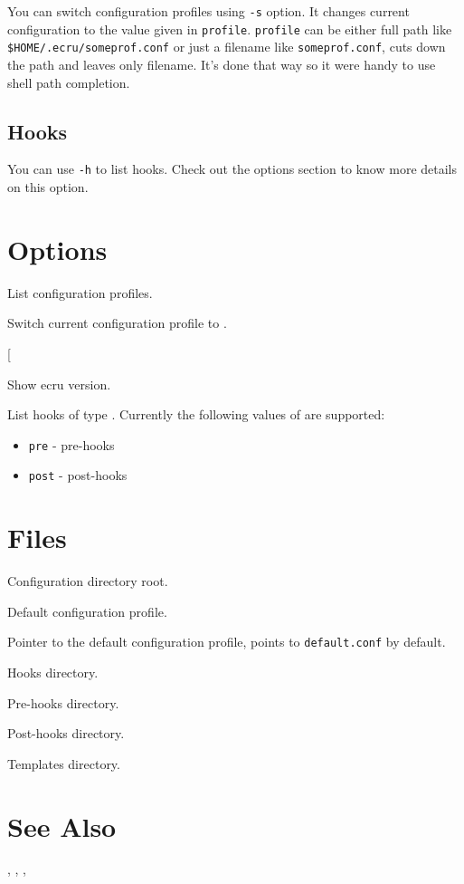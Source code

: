 \documentclass[english]{article}
\begin{document}
You can switch configuration profiles using \texttt{-s} option. 
It changes current configuration to the value given in \texttt{profile}. \texttt{profile}
can be either full path like \texttt{\$HOME/.ecru/someprof.conf} or just a
filename like \texttt{someprof.conf},  cuts down the path and leaves
only filename. It's done that way so it were handy to use shell path completion.

\subsection{Hooks}
You can use \texttt{-h} to list hooks. Check out the options section to know more
details on this option.

\section{Options}

\begin{Description}\setlength{\itemsep}{0cm}
\item[\Opt{-l}] List configuration profiles.
\item[\OptArg{-s}{path} Switch current configuration profile to \Arg{path}.
\item[\Opt{-v}] Show ecru version.
\item[\OptArg{-h}{hook}] List hooks of type . Currently the following
values of  are supported:
	\begin{itemize}
		\item \texttt{pre} - pre-hooks
		\item \texttt{post} - post-hooks
	\end{itemize}
\end{Description}

\section{Files}

\begin{Description}\setlength{\itemsep}{0cm}
\item[\File{\$HOME/.ecru}] Configuration directory root.
\item[\File{\$HOME/.ecru/default.conf}] Default configuration profile.
\item[\File{\$HOME/.ecru/current}] Pointer to the default configuration
profile, points to \texttt{default.conf} by default.
\item[\File{\$HOME/.ecru/hooks}] Hooks directory.
\item[\File{\$HOME/.ecru/hooks/pre}] Pre-hooks directory.
\item[\File{\$HOME/.ecru/hooks/post}] Post-hooks directory.
\item[\File{\$HOME/.ecru/templates}] Templates directory.
\end{Description}

\section{See Also}

, , , 
\end{document}

